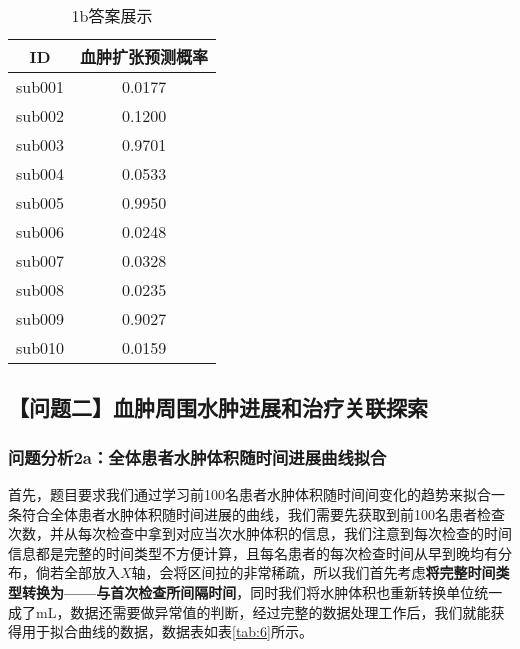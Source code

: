 \documentclass[bwprint]{gmcmthesis}
\begin{document}
				\begin{table}[H]
					\centering
					\caption{1b答案展示}
					\label{tab:5}
					\setlength{\tabcolsep}{17mm}
					\begin{tabular}{|c|c|}
						\hline
						\rowcolor{blue!25} ID & 血肿扩张预测概率 \\ \hline
						\rowcolor{blue!5}sub001 & 0.0177 \\ \hline
						\rowcolor{white!5}sub002 & 0.1200 \\ \hline
						\rowcolor{blue!5}sub003 & 0.9701 \\ \hline
						\rowcolor{white!5}sub004 & 0.0533  \\ \hline
						\rowcolor{blue!5}sub005 & 0.9950  \\ \hline
						\rowcolor{white!5}sub006 & 0.0248  \\ \hline
						\rowcolor{blue!5}sub007 & 0.0328  \\ \hline
						\rowcolor{white!5}sub008 & 0.0235 \\ \hline
						\rowcolor{blue!5}sub009 & 0.9027  \\ \hline
						\rowcolor{white!5}sub010 & 0.0159  \\ \hline
					\end{tabular}
				\end{table}
				
							
		
		\subsection{【问题二】血肿周围水肿进展和治疗关联探索}
			\subsubsection{问题分析2a：全体患者水肿体积随时间进展曲线拟合}
				首先，题目要求我们通过学习前100名患者水肿体积随时间间变化的趋势来拟合一条符合全体患者水肿体积随时间进展的曲线，我们需要先获取到前100名患者检查次数，并从每次检查中拿到对应当次水肿体积的信息，我们注意到每次检查的时间信息都是完整的时间类型不方便计算，且每名患者的每次检查时间从早到晚均有分布，倘若全部放入$X$轴，会将区间拉的非常稀疏，所以我们首先考虑\textbf{将完整时间类型转换为——与首次检查所间隔时间}，同时我们将水肿体积也重新转换单位统一成了mL，数据还需要做异常值的判断，经过完整的数据处理工作后，我们就能获得用于拟合曲线的数据，数据表如表\ref{tab:6}所示。
				
\end{document}
